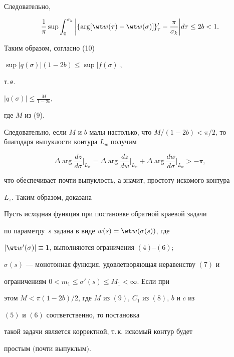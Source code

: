 Следовательно,


$$


\frac{1}{\pi} \sup \int_0^{\sigma_k} \bigg|\{\arg [\wt w(\tau) -


\wt w(\sigma)]\}'_{\tau} - \frac{\pi}{\sigma_k}\bigg| d\tau \leq 2 b < 1.


$$


Таким образом, согласно (10)


$\sup |q(\sigma)| (1 - 2 b) \leq \sup |f(\sigma)|$,


т.\,е.


$|q(\sigma)| \leq \frac{M}{1 - 2b}$,


где $M$ из (9).





Следовательно, если $M$ и $b$ малы настолько, что $M/(1 - 2b) <


{\pi}/{2}$, то благодаря выпуклости контура $L_w$ получим


$$


\Delta \arg\frac{dz}{d\sigma} \Big|_{L_w} = \Delta \arg \frac{dz}{dw}


\Big|_{L_w} + \Delta \arg \frac{dw}{d\sigma} \Big|_{L_w} > - \pi,


$$


что обеспечивает почти выпуклость, а значит, простоту искомого контура


$L_z$. Таким образом, доказана





\begin{thmnonum}


Пусть исходная функция при постановке обратной краевой задачи


по параметру~$s$ задана в виде $w(s) = \wt w(\sigma(s))$, где


$|\wt w'(\sigma)| \equiv 1$, выполняются ограничения $(4)$--$(6);$


$\sigma(s)$ --- монотонная функция, удовлетворяющая неравенству $(7)$ и


ограничениям $0 < m_1 \leq \sigma'(s) \leq M_1 < \infty$. Если при


этом $M < \pi (1 - 2b)/2$, где $M$ из $(9)$, $C_1$ из $(8)$, $b$ и $c$ из


$(5)$ и $(6)$ соответственно, то постановка


такой задачи является корректной, т.\,к. искомый контур будет


простым $($почти выпуклым$)$.


\end{thmnonum}





